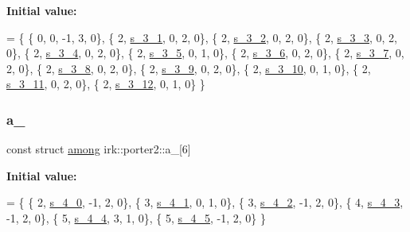 {\bfseries Initial value\+:}
\begin{DoxyCode}
=
\{
 \{ 0, 0, -1, 3, 0\},
 \{ 2, \mbox{\hyperlink{namespaceirk_1_1porter2_a0a55fdd0621d13f2086b2abb5b76f7b4}{s\_3\_1}}, 0, 2, 0\},
 \{ 2, \mbox{\hyperlink{namespaceirk_1_1porter2_ab95f6eec350e9887a738ce80e6cef4cd}{s\_3\_2}}, 0, 2, 0\},
 \{ 2, \mbox{\hyperlink{namespaceirk_1_1porter2_ac5b691634589bc3df2197532fa41cbc0}{s\_3\_3}}, 0, 2, 0\},
 \{ 2, \mbox{\hyperlink{namespaceirk_1_1porter2_ac51595b8cd7e9d78ca07e14008ce460a}{s\_3\_4}}, 0, 2, 0\},
 \{ 2, \mbox{\hyperlink{namespaceirk_1_1porter2_aaa98ad4b6967a41c319220a73b98a767}{s\_3\_5}}, 0, 1, 0\},
 \{ 2, \mbox{\hyperlink{namespaceirk_1_1porter2_a9bd185536b0e5955d7b9bcb8a26674f7}{s\_3\_6}}, 0, 2, 0\},
 \{ 2, \mbox{\hyperlink{namespaceirk_1_1porter2_ac72e07f685c8bc81dce64a97d865f54d}{s\_3\_7}}, 0, 2, 0\},
 \{ 2, \mbox{\hyperlink{namespaceirk_1_1porter2_a9fd08707ac0673c768e2f168bc7a9da9}{s\_3\_8}}, 0, 2, 0\},
 \{ 2, \mbox{\hyperlink{namespaceirk_1_1porter2_a696fa88371818196dbfcd6566c1ce696}{s\_3\_9}}, 0, 2, 0\},
 \{ 2, \mbox{\hyperlink{namespaceirk_1_1porter2_a6e16ab8f016da1f466dbd92f478f026d}{s\_3\_10}}, 0, 1, 0\},
 \{ 2, \mbox{\hyperlink{namespaceirk_1_1porter2_a0a5b3d73adc59c2f07899e591478726d}{s\_3\_11}}, 0, 2, 0\},
 \{ 2, \mbox{\hyperlink{namespaceirk_1_1porter2_afd1749decde825be3b0be9ed70f575ba}{s\_3\_12}}, 0, 1, 0\}
\}
\end{DoxyCode}
\mbox{\label{namespaceirk_1_1porter2_a41b6ded4808739576a7b3b6bf8ac05e2}} 
\subsubsection{\texorpdfstring{a\+\_}{a\_4}}
{\footnotesize\ttfamily const struct \mbox{\hyperlink{structirk_1_1porter2_1_1among}{among}} irk\+::porter2\+::a\+\_\mbox{[}6\mbox{]}\hspace{0.3cm}{\ttfamily [static]}}

{\bfseries Initial value\+:}
\begin{DoxyCode}
=
\{
 \{ 2, \mbox{\hyperlink{namespaceirk_1_1porter2_ada432308332ea21d3ab7743bf52434f8}{s\_4\_0}}, -1, 2, 0\},
 \{ 3, \mbox{\hyperlink{namespaceirk_1_1porter2_a19a3e17b4342f753aeb734f4e3b2c952}{s\_4\_1}}, 0, 1, 0\},
 \{ 3, \mbox{\hyperlink{namespaceirk_1_1porter2_a113a49ce14863d5847c8993dd450087d}{s\_4\_2}}, -1, 2, 0\},
 \{ 4, \mbox{\hyperlink{namespaceirk_1_1porter2_abf7569b3f35319c97ffc4d5d3ee95e32}{s\_4\_3}}, -1, 2, 0\},
 \{ 5, \mbox{\hyperlink{namespaceirk_1_1porter2_add32fbfe6cc4755e9866543364b760c7}{s\_4\_4}}, 3, 1, 0\},
 \{ 5, \mbox{\hyperlink{namespaceirk_1_1porter2_a0479f23a4d8456604041f7b9ad675376}{s\_4\_5}}, -1, 2, 0\}
\}
\end{DoxyCode}
\mbox{\label{namespaceirk_1_1porter2_a463bd6388f21d13a808ad5553de2eec1}} 
